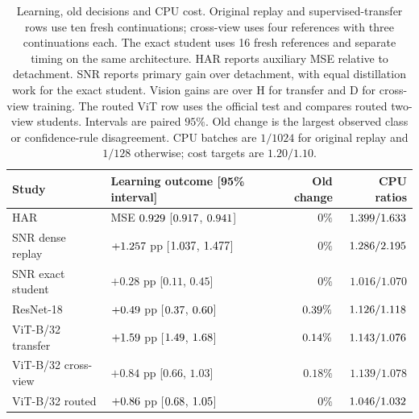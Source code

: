 \begin{table}[t]
\centering
\caption{Learning, old decisions and CPU cost. Original replay and
supervised-transfer rows use ten fresh continuations; cross-view uses
four references with three continuations each. The exact student uses
16 fresh references and separate timing on the same architecture. HAR
reports auxiliary MSE relative to detachment. SNR reports primary gain
over detachment, with equal distillation work for the exact student.
Vision gains are over H for transfer and D for cross-view training.
The routed ViT row uses the official test and compares routed two-view students.
Intervals are paired $95\%$. Old change is the largest observed
class or confidence-rule disagreement. CPU batches are $1/1024$ for
original replay and $1/128$ otherwise; cost targets are $1.20/1.10$.}
\label{tab:deployment_frontier}
\small
\begin{tabular}{llrr}
\toprule
Study & Learning outcome [95\% interval] & Old change & CPU ratios \\
\midrule
HAR & MSE $0.929$ [$0.917$, $0.941$] & $0\%$ & $1.399/1.633$ \\
SNR dense replay & $+1.257$ pp [$1.037$, $1.477$] & $0\%$ & $1.286/2.195$ \\
SNR exact student & $+0.28$ pp [$0.11$, $0.45$] & $0\%$ & $1.016/1.070$ \\
ResNet-18 & $+0.49$ pp [$0.37$, $0.60$] & $0.39\%$ & $1.126/1.118$ \\
ViT-B/32 transfer & $+1.59$ pp [$1.49$, $1.68$] & $0.14\%$ & $1.143/1.076$ \\
ViT-B/32 cross-view & $+0.84$ pp [$0.66$, $1.03$] & $0.18\%$ & $1.139/1.078$ \\
ViT-B/32 routed & $+0.86$ pp [$0.68$, $1.05$] & $0\%$ & $1.046/1.032$ \\
\bottomrule
\end{tabular}
\end{table}
